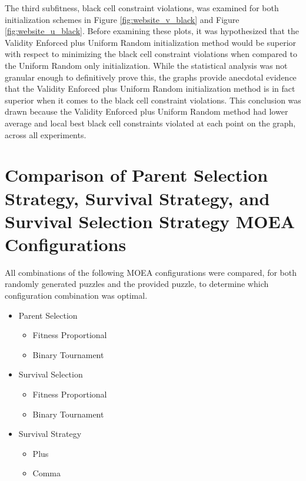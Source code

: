 \documentclass[11pt]{article}
\begin{document}
The third subfitness, black cell constraint violations, was examined for both initialization
schemes in Figure \ref{fig:website_v_black} and Figure \ref{fig:website_u_black}. Before examining
these plots, it was hypothesized that the Validity Enforced plus Uniform Random initialization 
method would be superior with respect to minimizing the black cell constraint violations when compared
to the Uniform Random only initialization. While the statistical analysis was not granular enough to
definitively prove this, the graphs provide anecdotal evidence that the Validity Enforced plus Uniform
Random initialization method is in fact superior when it comes to the black cell constraint violations.
This conclusion was drawn because the Validity Enforced plus Uniform Random method had lower average and
local best black cell constraints violated at each point on the graph, across all experiments.


\section{Comparison of Parent Selection Strategy, Survival Strategy, and Survival Selection Strategy 
MOEA Configurations}

All combinations of the following MOEA configurations were compared, for both randomly generated 
puzzles and the provided puzzle, to determine which configuration combination was optimal.

\begin{itemize}
    \item Parent Selection
    \begin{itemize}
        \item Fitness Proportional
        \item Binary Tournament
    \end{itemize}

    \item Survival Selection
    \begin{itemize}
        \item Fitness Proportional
        \item Binary Tournament
    \end{itemize}

    \item Survival Strategy 
    \begin{itemize}
        \item Plus
        \item Comma
    \end{itemize}
\end{itemize}
\end{document}
